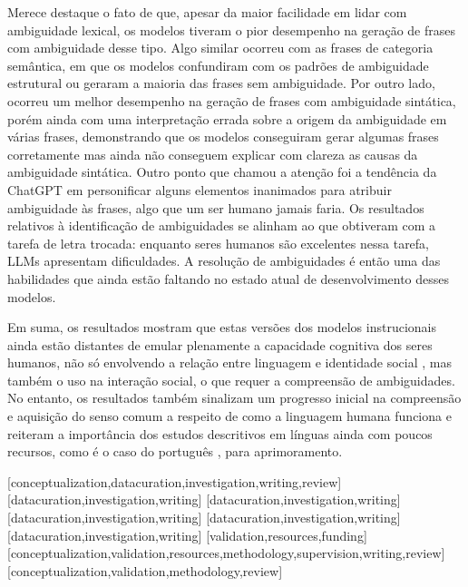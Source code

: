 \documentclass[portuguese]{textolivre}
\begin{document}
Merece destaque o fato de que, apesar da maior facilidade em lidar com ambiguidade lexical, os modelos tiveram o pior desempenho na geração de frases com ambiguidade desse tipo. Algo similar ocorreu com as frases de categoria semântica, em que os modelos confundiram com os padrões de ambiguidade estrutural ou geraram a maioria das frases sem ambiguidade. Por outro lado, ocorreu um melhor desempenho na geração de frases com ambiguidade sintática, porém ainda com uma interpretação errada sobre a origem da ambiguidade em várias frases, demonstrando que os modelos conseguiram gerar algumas frases corretamente mas ainda não conseguem explicar com clareza as causas da ambiguidade sintática. Outro ponto que chamou a atenção foi a tendência da ChatGPT em personificar alguns elementos inanimados para atribuir ambiguidade às frases, algo que um ser humano jamais faria. Os resultados relativos à identificação de ambiguidades se alinham ao que  \cite{marcus2023sentence} obtiveram com a tarefa de letra trocada: enquanto seres humanos são excelentes nessa tarefa, LLMs apresentam dificuldades. A resolução de ambiguidades é então uma das habilidades que ainda estão faltando no estado atual de desenvolvimento desses modelos.

Em suma, os resultados mostram que estas versões dos modelos instrucionais ainda estão distantes de emular plenamente a capacidade cognitiva dos seres humanos, não só envolvendo a relação entre linguagem e identidade social \cite{freitag2021preconceito}, mas também o uso na interação social, o que requer a compreensão de ambiguidades. No entanto, os resultados também sinalizam um progresso inicial na compreensão e aquisição do senso comum a respeito de como a linguagem humana funciona e reiteram a importância dos estudos descritivos em línguas ainda com poucos recursos, como é o caso do português \cite{finger2021inteligencia, freitag2022sociolinguistic}, para aprimoramento.

\printbibliography\label{sec-bib}
\begin{contributors}
[conceptualization,datacuration,investigation,writing,review]
[datacuration,investigation,writing]
[datacuration,investigation,writing]
[datacuration,investigation,writing]
[datacuration,investigation,writing]
[datacuration,investigation,writing]
[validation,resources,funding]
[conceptualization,validation,resources,methodology,supervision,writing,review]
[conceptualization,validation,methodology,review]
\end{contributors}


\end{document}
